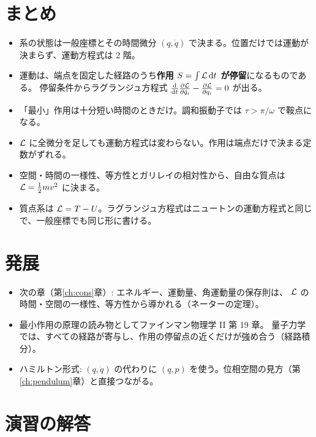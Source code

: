 \section{まとめ}\label{sec:eom-summary}

\begin{summary}
\begin{itemize}
  \item 系の状態は一般座標とその時間微分 $(q,\dot q)$ で決まる。位置だけでは運動が決まらず、運動方程式は 2 階。
  \item 運動は、端点を固定した経路のうち\textbf{作用 $S=\int\mathcal{L}\,\mathrm{d} t$ が停留}になるものである。
    停留条件からラグランジュ方程式 $\tfrac{\mathrm{d}}{\mathrm{d} t}\frac{\partial \mathcal{L}}{\partial \dot q_i}-\frac{\partial \mathcal{L}}{\partial q_i}=0$ が出る。
  \item 「最小」作用は十分短い時間のときだけ。調和振動子では $\tau>\pi/\omega$ で鞍点になる。
  \item $\mathcal{L}$ に全微分を足しても運動方程式は変わらない。作用は端点だけで決まる定数がずれる。
  \item 空間・時間の一様性、等方性とガリレイの相対性から、自由な質点は $\mathcal{L}=\tfrac12mv^2$ に決まる。
  \item 質点系は $\mathcal{L}=T-U$。ラグランジュ方程式はニュートンの運動方程式と同じで、一般座標でも同じ形に書ける。
\end{itemize}
\end{summary}

\section{発展}\label{sec:eom-advanced}
\begin{itemize}
  \item 次の章（第\ref{ch:cons}章）: エネルギー、運動量、角運動量の保存則は、
    $\mathcal{L}$ の時間・空間の一様性、等方性から導かれる（ネーターの定理）。
  \item 最小作用の原理の読み物としてファインマン物理学 II 第 19 章\cite{feynman}。
    量子力学では、すべての経路が寄与し、作用の停留点の近くだけが強め合う（経路積分）。
  \item ハミルトン形式: $(q,\dot q)$ の代わりに $(q,p)$ を使う。位相空間の見方（第\ref{ch:pendulum}章）と直接つながる。
\end{itemize}

\section{演習の解答}\label{sec:eom-solutions}

